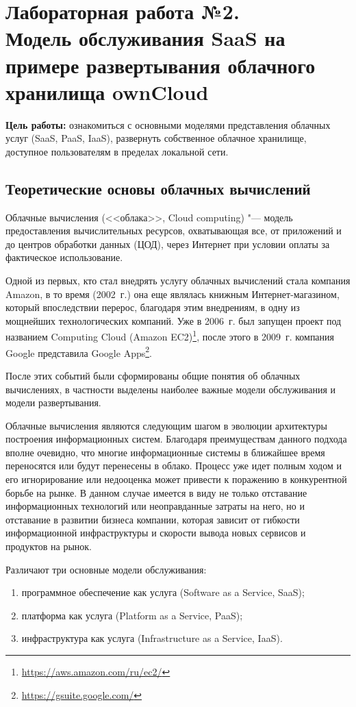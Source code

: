 \section[ЛР №2. Модель обслуживания SaaS, ownCloud]{Лабораторная работа №2. \\
Модель обслуживания SaaS на примере развертывания облачного хранилища ownCloud}

\textbf{Цель работы:} ознакомиться с основными моделями представления облачных услуг (SaaS, PaaS, IaaS), развернуть собственное облачное хранилище, доступное пользователям в пределах локальной сети.

\subsection{Теоретические основы облачных вычислений}

Облачные вычисления (<<облака>>, Cloud computing) "--- модель предоставления вычислительных ресурсов, охватывающая все, от приложений и до центров обработки данных (ЦОД), через Интернет при условии оплаты за фактическое использование.

Одной из первых, кто стал внедрять услугу облачных вычислений стала компания Amazon, в то время (2002~г.) она еще являлась книжным Интернет-магазином, который впоследствии перерос, благодаря этим внедрениям, в одну из мощнейших технологических компаний.
Уже в 2006~г. был запущен проект под названием Computing Cloud (Amazon EC2)\footnote{\url{https://aws.amazon.com/ru/ec2/}}, после этого в 2009~г. компания Google представила Google Apps\footnote{\url{https://gsuite.google.com/}}.

После этих событий были сформированы общие понятия об облачных вычислениях, в частности выделены наиболее важные модели обслуживания и модели развертывания.

Облачные вычисления являются следующим шагом в эволюции архитектуры построения информационных систем.
Благодаря преимуществам данного подхода вполне очевидно, что многие информационные системы в ближайшее время переносятся или будут перенесены в облако.
Процесс уже идет полным ходом и его игнорирование или недооценка может привести к поражению в конкурентной борьбе на рынке.
В данном случае имеется в виду не только отставание информационных технологий или неоправданные затраты на него, но и отставание в развитии бизнеса компании, которая зависит от гибкости информационной инфраструктуры и скорости вывода новых сервисов и продуктов на рынок.

Различают три основные модели обслуживания:
\begin{enumerate}
    \item программное обеспечение как услуга (Software as a Service, SaaS);
    \item платформа как услуга (Platform as a Service, PaaS);
    \item инфраструктура как услуга (Infrastructure as a Service, IaaS).
\end{enumerate}

